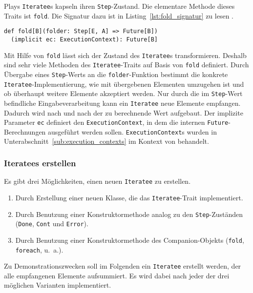 Plays \lstinline|Iteratee|s kapseln ihren \lstinline|Step|-Zustand.
Die elementare Methode dieses Traits ist \lstinline|fold|.
Die Signatur dazu ist in Listing~\ref{lst:fold_signatur} zu lesen \cite[vgl.][Z.~400]{play_iteratee_source_code}.
\begin{lstlisting}[caption=Die Signatur von fold, label=lst:fold_signatur]
def fold[B](folder: Step[E, A] => Future[B])
  (implicit ec: ExecutionContext): Future[B]
\end{lstlisting}

Mit Hilfe von \lstinline|fold| lässt sich der Zustand des \lstinline|Iteratee|s transformieren.
Deshalb sind sehr viele Methoden des \lstinline|Iteratee|-Traits auf Basis von \lstinline|fold| definiert.
Durch Übergabe eines \lstinline|Step|-Werts an die \lstinline|folder|-Funktion bestimmt die konkrete \lstinline|Iteratee|-Implementierung, wie mit übergebenen Elementen umzugehen ist und ob überhaupt weitere Elemente akzeptiert werden.
Nur durch die im \lstinline|Step|-Wert befindliche Eingabeverarbeitung kann ein \lstinline|Iteratee| neue Elemente empfangen.
Dadurch wird nach und nach der zu berechnende Wert aufgebaut.
Der implizite Parameter \lstinline|ec| definiert den \lstinline|ExecutionContext|, in dem die internen \lstinline|Future|-Berechnungen ausgeführt werden sollen.
\lstinline|ExecutionContext|s wurden in Unterabschnitt~\ref{sub:execution_contexts} im Kontext von  behandelt.

\subsubsection{Iteratees erstellen} %
\label{ssub:iteratees_erstellen}

Es gibt drei Möglichkeiten, einen neuen \lstinline|Iteratee| zu erstellen.
\begin{enumerate}
  \item Durch Erstellung einer neuen Klasse, die das \lstinline|Iteratee|-Trait implementiert.
  \item Durch Benutzung einer Konstruktormethode analog zu den \lstinline|Step|-Zuständen (\lstinline|Done|, \lstinline|Cont| und \lstinline|Error|).
  \item Durch Benutzung einer Konstruktormethode des Companion-Objekts (\lstinline|fold|, \lstinline|foreach|, u.~a.).
\end{enumerate}

Zu Demonstrationszwecken soll im Folgenden ein \lstinline|Iteratee| erstellt werden, der alle empfangenen Elemente aufsummiert.
Es wird dabei nach jeder der drei möglichen Varianten implementiert.

